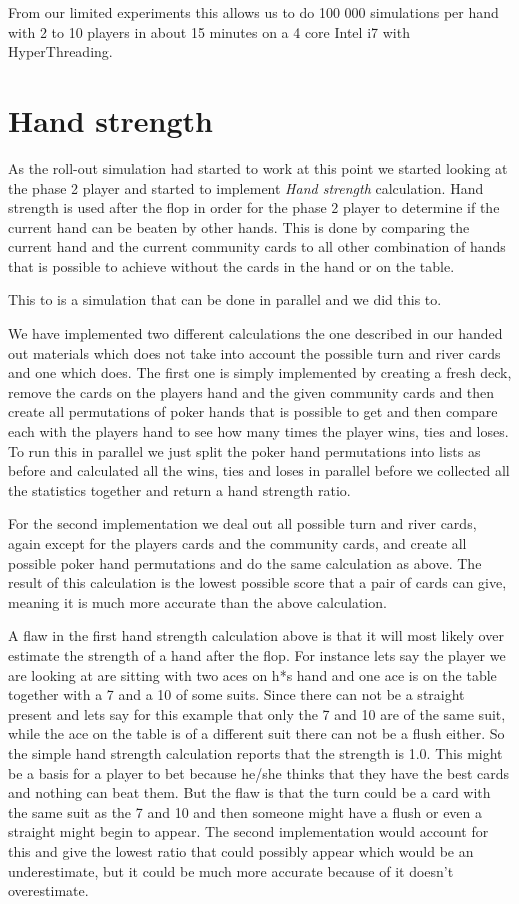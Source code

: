 \documentclass[titlepage, a4paper]{article}
\begin{document}
From our limited experiments this allows us to do 100 000 simulations per hand with
2 to 10 players in about 15 minutes on a 4 core Intel i7 with HyperThreading.

\section{Hand strength}\label{hand strength}
As the roll-out simulation had started to work at this point we started looking at
the phase 2 player and started to implement \textit{Hand strength} calculation.
Hand strength is used after the flop in order for the phase 2 player to determine if
the current hand can be beaten by other hands. This is done by comparing the current
hand and the current community cards to all other combination of hands that is possible
to achieve without the cards in the hand or on the table. 

This to is a simulation that can be done in parallel and we did this to. 

We have implemented two different
calculations the one described in our handed out materials which does not take into
account the possible turn and river cards and one which does. The first one is simply
implemented by creating a fresh deck, remove the cards on the players hand and the
given community cards and then create all permutations of poker hands that is possible
to get and then compare each with the players hand to see how many times the player
wins, ties and loses. To run this in parallel we just split the poker hand permutations
into lists as before and calculated all the wins, ties and loses in parallel before
we collected all the statistics together and return a hand strength ratio.

For the second implementation we deal out all possible turn and river cards, again
except for the players cards and the community cards, and create all possible poker
hand permutations and do the same calculation as above. The result of this calculation
is the lowest possible score that a pair of cards can give, meaning it is much more
accurate than the above calculation.

A flaw in the first hand strength calculation above is that it will most likely
over estimate the strength of a hand after the flop. For instance lets say the player
we are looking at are sitting with two aces on h*s hand and one ace is on the table
together with a 7 and a 10 of some suits. Since there can not be a straight present
and lets say for this example that only the 7 and 10 are of the same suit, while
the ace on the table is of a different suit there can not be a flush either. So the
simple hand strength calculation reports that the strength is 1.0. This might be
a basis for a player to bet because he/she thinks that they have the best cards and
nothing can beat them. But the flaw is that the turn could be a card with the same suit
as the 7 and 10 and then someone might have a flush or even a straight might begin to
appear. The second implementation would account for this and give the lowest ratio
that could possibly appear which would be an underestimate, but it could be
much more accurate because of it doesn't overestimate.
\end{document}

